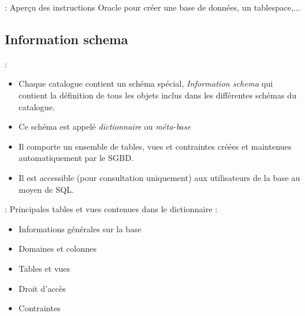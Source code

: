 \documentclass[10pt]{beamer}
\begin{document}
\begin{frame}{\secname : \subsecname}
    Aperçu des instructions Oracle pour créer une base de données, un tablespace,...
    
\end{frame}

\subsection{Information schema}
\begin{frame}{\secname : \subsecname}
    \begin{itemize}
        \item Chaque catalogue contient un schéma spécial, \emph{Information schema} qui contient la définition de tous les objets inclus dans les différentes schémas du catalogue.
        \item Ce schéma est appelé \emph{dictionnaire} ou \emph{méta-base}
        \item Il comporte un ensemble de tables, vues et contraintes créées et maintenues automatiquement par le SGBD.
        \item Il est accessible (pour consultation uniquement) aux utilisateurs de la base au moyen de SQL.
    \end{itemize}
\end{frame}

\begin{frame}{\secname : \subsecname}
    Principales tables et vues contenues dans le dictionnaire :
    \begin{itemize}
        \item Informations générales sur la base
        \item Domaines et colonnes
        \item Tables et vues
        \item Droit d'accès
        \item Contraintes
    \end{itemize}
\end{frame}
\end{document}
